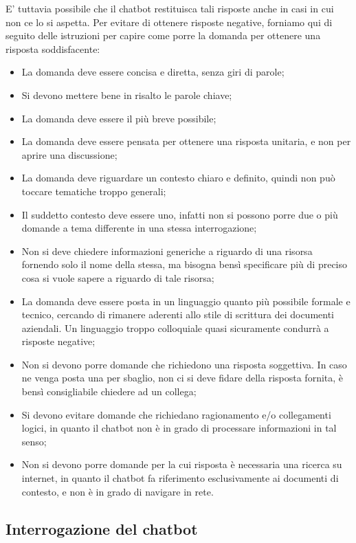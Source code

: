 E' tuttavia possibile che il chatbot restituisca tali risposte anche in casi in cui non ce lo si aspetta.
Per evitare di ottenere risposte negative, forniamo qui di seguito delle istruzioni per capire come porre la domanda per
ottenere una risposta soddisfacente:
\begin{itemize}
    \item La domanda deve essere concisa e diretta, senza giri di parole;
    \item Si devono mettere bene in risalto le parole chiave;
    \item La domanda deve essere il più breve possibile;
    \item La domanda deve essere pensata per ottenere una risposta unitaria, e non per aprire una discussione;
    \item La domanda deve riguardare un contesto chiaro e definito, quindi non può toccare tematiche troppo generali;
    \item Il suddetto contesto deve essere uno, infatti non si possono porre due o più domande a tema differente in una stessa
    interrogazione;
    \item Non si deve chiedere informazioni generiche a riguardo di una risorsa fornendo solo il nome della stessa, ma bisogna
    bensì specificare più di preciso cosa si vuole sapere a riguardo di tale risorsa;
    \item La domanda deve essere posta in un linguaggio quanto più possibile formale e tecnico, cercando di rimanere aderenti
    allo stile di scrittura dei documenti aziendali. Un linguaggio troppo colloquiale quasi sicuramente condurrà a risposte negative;
    \item Non si devono porre domande che richiedono una risposta soggettiva. In caso ne venga posta una per sbaglio, non ci si deve
    fidare della risposta fornita, è bensì consigliabile chiedere ad un collega;
    \item Si devono evitare domande che richiedano ragionamento e/o collegamenti logici, in quanto il chatbot non è in grado di
    processare informazioni in tal senso;
    \item Non si devono porre domande per la cui risposta è necessaria una ricerca su internet, in quanto il chatbot fa
    riferimento esclusivamente ai documenti di contesto, e non è in grado di navigare in rete.
\end{itemize}


\subsection{Interrogazione del chatbot}

